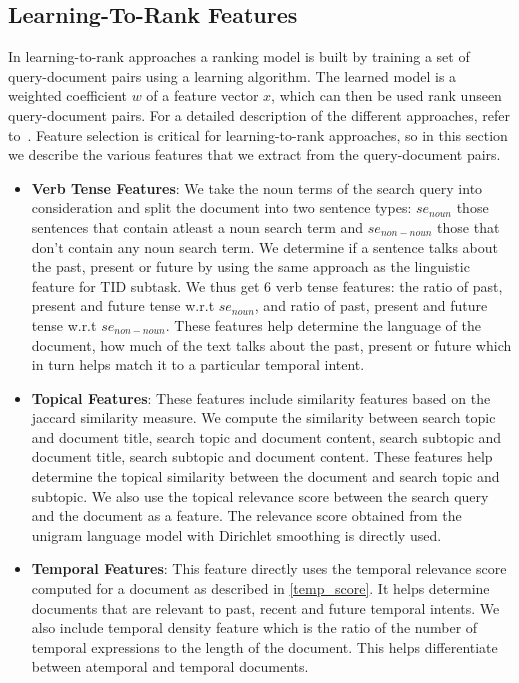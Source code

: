 \documentclass{sig-alternate}
\begin{document}
\subsection{Learning-To-Rank Features}\label{ltor_f}
In learning-to-rank approaches a ranking model is built by training a set of query-document pairs using a learning algorithm. The learned model is a weighted coefficient $w$ of a feature vector $x$, which can then be used rank unseen query-document pairs. For a detailed description of the different approaches, refer to~\cite{ltor}. Feature selection is critical for learning-to-rank approaches, so in this section we describe the various features that we extract from the query-document pairs.
\begin{itemize}
\item\textbf{Verb Tense Features}: We take the noun terms of the search query into consideration and split the document into two sentence types: $se_{noun}$ those sentences that contain atleast a noun search term and $se_{non-noun}$ those that don't contain any noun search term. We determine if a sentence talks about the past, present or future by using the same approach as the linguistic feature for TID subtask. We thus get 6 verb tense features: the ratio of past, present and future tense w.r.t $se_{noun}$, and ratio of past, present and future tense w.r.t $se_{non-noun}$. These features help determine the language of the document, how much of the text talks about the past, present or future which in turn helps match it to a particular temporal intent. 
\item\textbf{Topical Features}: These features include similarity features based on the jaccard similarity measure. We compute the similarity between search topic and document title, search topic and document content, search subtopic and document title, search subtopic and document content. These features help determine the topical similarity between the document and search topic and subtopic. We also use the topical relevance score between the search query and the document as a feature. The relevance score obtained from the unigram language model with Dirichlet smoothing is directly used. 
\item\textbf{Temporal Features}: This feature directly uses the temporal relevance score computed for a document as described in \ref{temp_score}. It helps determine documents that are relevant to past, recent and future temporal intents. We also include temporal density feature which is the ratio of the number of temporal expressions to the length of the document. This helps differentiate between atemporal and temporal documents. 
\end{itemize}
\end{document}
